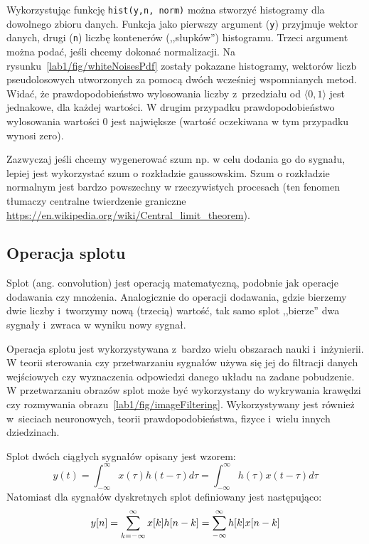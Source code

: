 Wykorzystując funkcję \texttt{hist(y,n, norm)} można stworzyć histogramy dla dowolnego zbioru danych. Funkcja jako pierwszy argument (\texttt{y}) przyjmuje wektor danych, drugi (\texttt{n}) liczbę kontenerów (,,słupków'') histogramu. Trzeci argument można podać, jeśli chcemy dokonać normalizacji. Na rysunku~\ref{lab1/fig/whiteNoisesPdf} zostały pokazane histogramy, wektorów liczb pseudolosowych utworzonych za pomocą dwóch wcześniej wspomnianych metod. Widać, że prawdopodobieństwo wylosowania liczby z~przedziału od $\langle 0,1 \rangle$ jest jednakowe, dla każdej wartości. W drugim przypadku prawdopodobieństwo wylosowania wartości $0$ jest największe (wartość oczekiwana w tym przypadku wynosi zero).

Zazwyczaj jeśli chcemy wygenerować szum np. w celu dodania go do sygnału, lepiej jest wykorzystać szum o rozkładzie gaussowskim. Szum o rozkładzie normalnym jest bardzo powszechny w rzeczywistych procesach (ten fenomen tłumaczy centralne twierdzenie graniczne \url{https://en.wikipedia.org/wiki/Central_limit_theorem}). 

\subsection{Operacja splotu}
Splot (ang. convolution) jest operacją matematyczną, podobnie jak operacje dodawania czy mnożenia. Analogicznie do operacji dodawania, gdzie bierzemy dwie liczby i~tworzymy nową (trzecią) wartość, tak samo splot ,,bierze'' dwa sygnały i~zwraca w wyniku nowy sygnał. 

Operacja splotu jest wykorzystywana z~bardzo wielu obszarach nauki i~inżynierii. W teorii sterowania czy przetwarzaniu sygnałów używa się jej do filtracji danych wejściowych czy wyznaczenia odpowiedzi danego układu na zadane pobudzenie. W przetwarzaniu obrazów splot może być wykorzystany do wykrywania krawędzi czy rozmywania obrazu~\ref{lab1/fig/imageFiltering}. Wykorzystywany jest również w~sieciach neuronowych, teorii prawdopodobieństwa, fizyce i~wielu innych dziedzinach.


Splot dwóch ciągłych sygnałów opisany jest wzorem:
\begin{equation}
	y(t) = \int_{-\infty}^{\infty}x(\tau)h(t-\tau)d\tau=\int_{-\infty}^{\infty}h(\tau)x(t-\tau)d\tau 
\end{equation}
Natomiast dla sygnałów dyskretnych splot definiowany jest następująco:
\begin{equation}
	y[n]=\sum_{k=-\infty}^{\infty}x[k]h[n-k]=\sum_{-\infty}^{\infty}h[k]x[n-k]\\ 
\end{equation}

